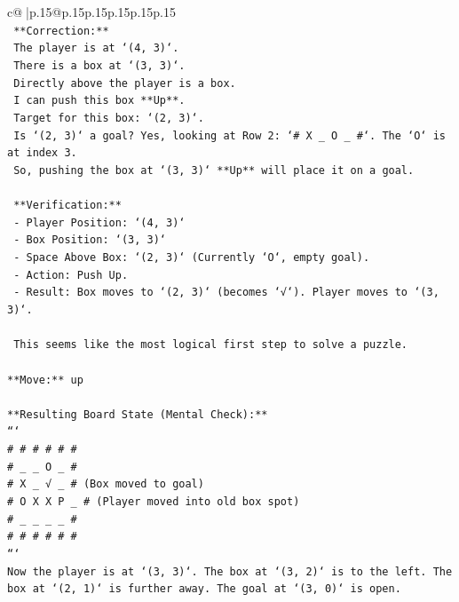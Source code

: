 \documentclass{article}
\begin{document}
{\begin{supertabular}{c@{$\;$}|p{.15\linewidth}@{}p{.15\linewidth}p{.15\linewidth}p{.15\linewidth}p{.15\linewidth}p{.15\linewidth}}
{{{\\ 
\texttt{    **Correction:**} \\
\texttt{    The player is at `(4, 3)`.} \\
\texttt{    There is a box at `(3, 3)`.} \\
\texttt{    Directly above the player is a box.} \\
\texttt{    I can push this box **Up**.} \\
\texttt{    Target for this box: `(2, 3)`.} \\
\texttt{    Is `(2, 3)` a goal? Yes, looking at Row 2: `\# X \_ O \_ \#`. The `O` is at index 3.} \\
\texttt{    So, pushing the box at `(3, 3)` **Up** will place it on a goal.} \\
\\ 
\texttt{    **Verification:**} \\
\texttt{    {-}   Player Position: `(4, 3)`} \\
\texttt{    {-}   Box Position: `(3, 3)`} \\
\texttt{    {-}   Space Above Box: `(2, 3)` (Currently `O`, empty goal).} \\
\texttt{    {-}   Action: Push Up.} \\
\texttt{    {-}   Result: Box moves to `(2, 3)` (becomes `√`). Player moves to `(3, 3)`.} \\
\\ 
\texttt{    This seems like the most logical first step to solve a puzzle.} \\
\\ 
\texttt{**Move:** up} \\
\\ 
\texttt{**Resulting Board State (Mental Check):**} \\
\texttt{```} \\
\texttt{\# \# \# \# \# \#} \\
\texttt{\# \_ \_ O \_ \#} \\
\texttt{\# X \_ √ \_ \#  (Box moved to goal)} \\
\texttt{\# O X X P \_ \# (Player moved into old box spot)} \\
\texttt{\# \_ \_ \_ \_ \#} \\
\texttt{\# \# \# \# \# \#} \\
\texttt{```} \\
\texttt{Now the player is at `(3, 3)`. The box at `(3, 2)` is to the left. The box at `(2, 1)` is further away. The goal at `(3, 0)` is open.} \\
}}}
\end{supertabular}}
\end{document}
